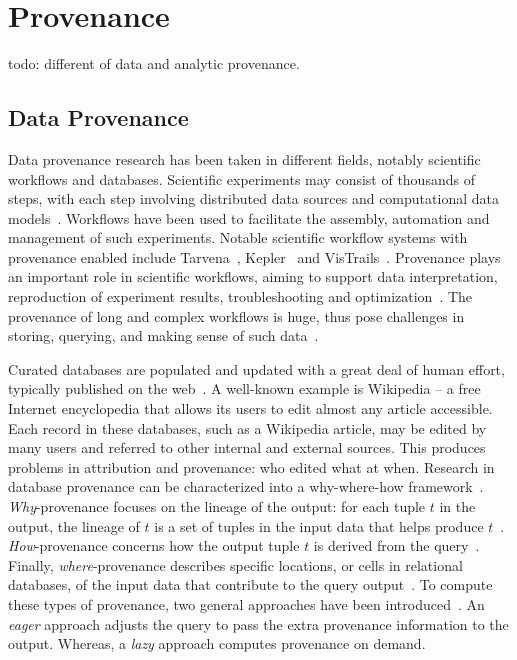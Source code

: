 \section{Provenance}
todo: different of data and analytic provenance.

\subsection{Data Provenance}
Data provenance research has been taken in different fields, notably scientific workflows and databases. Scientific experiments may consist of thousands of steps, with each step involving distributed data sources and computational data models~\cite{Gil2007}. Workflows have been used to facilitate the assembly, automation and management of such experiments. Notable scientific workflow systems with provenance enabled include Tarvena~\cite{Zhao2008}, Kepler~\cite{Bowers2006} and VisTrails~\cite{Bavoil2005}. Provenance plays an important role in scientific workflows, aiming to support data interpretation, reproduction of experiment results, troubleshooting and optimization~\cite{Miles2007}. The provenance of long and complex workflows is huge, thus pose challenges in storing, querying, and making sense of such data~\cite{Davidson2007}.

Curated databases are populated and updated with a great deal of human effort, typically published on the web~\cite{Buneman2008}. A well-known example is Wikipedia -- a free Internet encyclopedia that allows its users to edit almost any article accessible. Each record in these databases, such as a Wikipedia article, may be edited by many users and referred to other internal and external sources. This produces problems in attribution and provenance: who edited what at when. Research in database provenance can be characterized into a why-where-how framework~\cite{Cheney2007}. \emph{Why}-provenance focuses on the lineage of the output: for each tuple $t$ in the output, the lineage of $t$ is a set of tuples in the input data that helps produce $t$~\cite{Cui2000}. \emph{How}-provenance concerns how the output tuple $t$ is derived from the query~\cite{Green2007}. Finally, \emph{where}-provenance describes specific locations, or cells in relational databases, of the input data that contribute to the query output~\cite{Buneman2001}. To compute these types of provenance, two general approaches have been introduced~\cite{Buneman2008}. An \emph{eager} approach adjusts the query to pass the extra provenance information to the output. Whereas, a \emph{lazy} approach computes provenance on demand.

